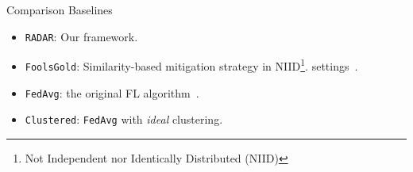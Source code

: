 \begin{frame}{Comparison Baselines}
      \begin{itemize}
        \item \texttt{RADAR}: Our framework.
        \item \texttt{FoolsGold}: Similarity-based mitigation strategy in NIID\footnote{Not Independent nor Identically Distributed (NIID)}. settings~\cite{fung_LimitationsFederatedLearning_2020}.
        \item \texttt{FedAvg}: the original FL algorithm~\cite{mcmahan_Communicationefficientlearningdeep_2017}.
        \item \texttt{Clustered}: \texttt{FedAvg} with \emph{ideal} clustering.
      \end{itemize}
\end{frame}
